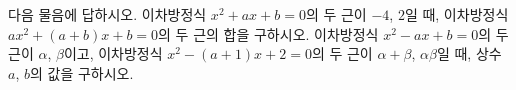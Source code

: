 다음 물음에 답하시오.
 이차방정식 $x^2+ax+b=0$의 두 근이 $-4$, $2$일 때, 이차방정식 $ax^2+(a+b)x+b=0$의 두 근의 합을 구하시오. 
 이차방정식 $x^2-ax+b=0$의 두 근이 $\alpha$, $\beta$이고, 이차방정식 $x^2-(a+1)x+2=0$의 두 근이 $\alpha+\beta$, $\alpha\beta$일 때, 상수~$a$, $b$의 값을 구하시오.

